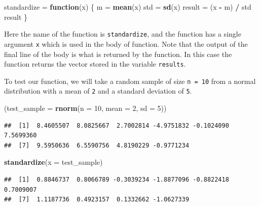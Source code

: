 \documentclass[]{book}
\newenvironment{Shaded}{\begin{snugshade}}{\end{snugshade}}
\newcommand{\KeywordTok}[1]{\textcolor[rgb]{0.13,0.29,0.53}{\textbf{#1}}}
\newcommand{\DataTypeTok}[1]{\textcolor[rgb]{0.13,0.29,0.53}{#1}}
\newcommand{\DecValTok}[1]{\textcolor[rgb]{0.00,0.00,0.81}{#1}}
\newcommand{\StringTok}[1]{\textcolor[rgb]{0.31,0.60,0.02}{#1}}
\newcommand{\ControlFlowTok}[1]{\textcolor[rgb]{0.13,0.29,0.53}{\textbf{#1}}}
\newcommand{\OperatorTok}[1]{\textcolor[rgb]{0.81,0.36,0.00}{\textbf{#1}}}
\newcommand{\NormalTok}[1]{#1}
\theoremstyle{definition}
\theoremstyle{definition}
\theoremstyle{definition}
\theoremstyle{remark}
\begin{document}
\begin{Shaded}
\begin{Highlighting}[]
\NormalTok{standardize =}\StringTok{ }\ControlFlowTok{function}\NormalTok{(x) \{}
\NormalTok{  m =}\StringTok{ }\KeywordTok{mean}\NormalTok{(x)}
\NormalTok{  std =}\StringTok{ }\KeywordTok{sd}\NormalTok{(x)}
\NormalTok{  result =}\StringTok{ }\NormalTok{(x }\OperatorTok{-}\StringTok{ }\NormalTok{m) }\OperatorTok{/}\StringTok{ }\NormalTok{std}
\NormalTok{  result}
\NormalTok{\}}
\end{Highlighting}
\end{Shaded}

Here the name of the function is \texttt{standardize}, and the function
has a single argument \texttt{x} which is used in the body of function.
Note that the output of the final line of the body is what is returned
by the function. In this case the function returns the vector stored in
the variable \texttt{results}.

To test our function, we will take a random sample of size
\texttt{n\ =\ 10} from a normal distribution with a mean of \texttt{2}
and a standard deviation of \texttt{5}.

\begin{Shaded}
\begin{Highlighting}[]
\NormalTok{(}\DataTypeTok{test_sample =} \KeywordTok{rnorm}\NormalTok{(}\DataTypeTok{n =} \DecValTok{10}\NormalTok{, }\DataTypeTok{mean =} \DecValTok{2}\NormalTok{, }\DataTypeTok{sd =} \DecValTok{5}\NormalTok{))}
\end{Highlighting}
\end{Shaded}

\begin{verbatim}
##  [1]  8.4605507  8.0825667  2.7002814 -4.9751832 -0.1024090  7.5699360
##  [7]  9.5950636  6.5590756  4.8190229 -0.9771234
\end{verbatim}

\begin{Shaded}
\begin{Highlighting}[]
\KeywordTok{standardize}\NormalTok{(}\DataTypeTok{x =}\NormalTok{ test_sample)}
\end{Highlighting}
\end{Shaded}

\begin{verbatim}
##  [1]  0.8846737  0.8066789 -0.3039234 -1.8877096 -0.8822418  0.7009007
##  [7]  1.1187736  0.4923157  0.1332662 -1.0627339
\end{verbatim}
\end{document}
